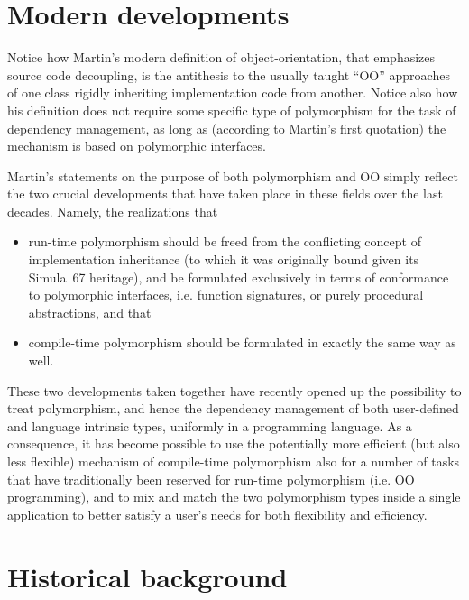 \documentclass[11pt,oneside]{report}
\begin{document}
\section{Modern developments}

Notice how Martin's modern definition of object-orientation, that
emphasizes source code decoupling, is the antithesis to the usually
taught ``OO'' approaches of one class rigidly inheriting
implementation code from another. Notice also how his definition does
not require some specific type of polymorphism for the task of
dependency management, as long as (according to Martin's first
quotation) the mechanism is based on polymorphic interfaces.

Martin's statements on the purpose of both polymorphism and OO simply
reflect the two crucial developments that have taken place in these
fields over the last decades. Namely, the realizations that
\begin{itemize}
\item
  run-time polymorphism should be freed from the conflicting concept
  of implementation inheritance (to which it was originally bound
  given its Simula~67 heritage), and be formulated exclusively in
  terms of conformance to polymorphic interfaces, i.e. function
  signatures, or purely procedural abstractions, and that
\item
  compile-time polymorphism should be formulated in exactly the same
  way as well.
\end{itemize}

These two developments taken together have recently opened up the
possibility to treat polymorphism, and hence the dependency management
of both user-defined and language intrinsic types, uniformly in a
programming language. As a consequence, it has become possible to use
the potentially more efficient (but also less flexible) mechanism of
compile-time polymorphism also for a number of tasks that have
traditionally been reserved for run-time polymorphism (i.e. OO
programming), and to mix and match the two polymorphism types inside a
single application to better satisfy a user's needs for both
flexibility and efficiency.

\section{Historical background}
\end{document}
